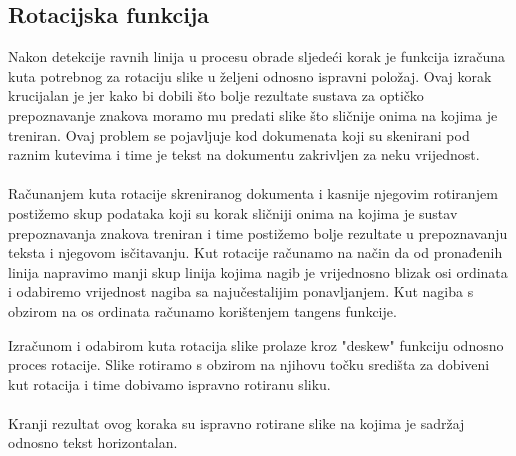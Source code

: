 \documentclass[times, utf8, zavrsni, numeric]{fer}
\begin{document}
\subsection{Rotacijska funkcija}
Nakon detekcije ravnih linija u procesu obrade sljedeći korak je funkcija izračuna kuta potrebnog za rotaciju slike u željeni odnosno ispravni položaj. Ovaj korak krucijalan je jer kako bi dobili što bolje rezultate sustava za optičko prepoznavanje znakova moramo mu predati slike što sličnije onima na kojima je treniran. Ovaj problem se pojavljuje kod dokumenata koji su skenirani pod raznim kutevima i time je tekst na dokumentu zakrivljen za neku vrijednost.
\\
\\
Računanjem kuta rotacije skreniranog dokumenta i kasnije njegovim rotiranjem postižemo skup podataka koji su korak sličniji onima na kojima je sustav prepoznavanja znakova treniran i time postižemo bolje rezultate u prepoznavanju teksta i njegovom isčitavanju.
Kut rotacije računamo na način da od pronađenih linija napravimo manji skup linija kojima nagib je vrijednosno blizak osi ordinata i odabiremo vrijednost nagiba sa najučestalijim ponavljanjem. Kut nagiba s obzirom na os ordinata računamo korištenjem tangens funkcije.

Izračunom i odabirom kuta rotacija slike prolaze kroz "deskew" funkciju odnosno proces rotacije. Slike rotiramo s obzirom na njihovu točku središta za dobiveni kut rotacija i time dobivamo ispravno rotiranu sliku.
\\
\\
Kranji rezultat ovog koraka su ispravno rotirane slike na kojima je sadržaj odnosno tekst horizontalan.
\\
\end{document}
